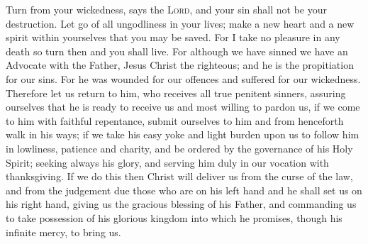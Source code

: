 \documentclass{liturgy}
\begin{document}
\begin{leader}
  Turn from your wickedness, says the \textsc{Lord}, and your sin shall not be your destruction.
  Let go of all ungodliness in your lives; make a new heart and a new spirit within yourselves that you may be saved.
  For I take no pleasure in any death so turn then and you shall live.
  For although we have sinned we have an Advocate with the Father, Jesus Christ the righteous; and he is the propitiation for our sins.
  For he was wounded for our offences and suffered for our wickedness.
  Therefore let us return to him, who receives all true penitent sinners, assuring ourselves that he is ready to receive us and most willing to pardon us, if we come to him with faithful repentance, submit ourselves to him and from henceforth walk in his ways; if we take his easy yoke and light burden upon us to follow him in lowliness, patience and charity, and be ordered by the governance of his Holy Spirit; seeking always his glory, and serving him duly in our vocation with thanksgiving.
  If we do this then Christ will deliver us from the curse of the law, and from the judgement due those who are on his left hand and he shall set us on his right hand, giving us the gracious blessing of his Father, and commanding us to take possession of his glorious kingdom into which he promises, though his infinite mercy, to bring us. 
\end{leader}
\end{document}
